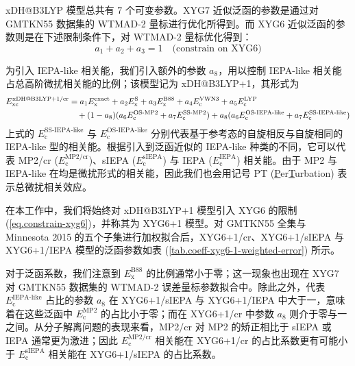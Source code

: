 xDH@B3LYP 模型总共有 7 个可变参数。XYG7 近似泛函的参数是通过对 GMTKN55 数据集的 WTMAD-2 量标进行优化所得到。而 XYG6 近似泛函的参数则是在下述限制条件下，对 WTMAD-2 量标优化得到：
\begin{equation}
  \label{eq.constrain-xyg6}
  a_1 + a_2 + a_3 = 1 \quad \text{(constrain on XYG6)}
\end{equation}

为引入 IEPA-like 相关能，我们引入额外的参数 $a_8$，用以控制 IEPA-like 相关能占总高阶微扰相关能的比例；该模型记为 xDH@B3LYP+1，其形式为
\begin{align}
  E_\mathrm{xc}^\text{xDH@B3LYP+1/cr} &= a_1 E_\mathrm{x}^\mathrm{exact} + a_2 E_\mathrm{x}^\mathrm{S} + a_3 E_\mathrm{x}^\mathrm{B88} + a_4 E_\mathrm{c}^\mathrm{VWN3} + a_5 E_\mathrm{c}^\mathrm{LYP} \notag \\
  &\quad + (1 - a_8) (a_6 E_\mathrm{c}^\text{OS-MP2} + a_7 E_\mathrm{c}^\text{SS-MP2}) + a_8 (a_6 E_\mathrm{c}^\text{OS-IEPA-like} + a_7 E_\mathrm{c}^\text{SS-IEPA-like})
\end{align}
上式的 $E_\mathrm{c}^\text{SS-IEPA-like}$ 与 $E_\mathrm{c}^\text{OS-IEPA-like}$ 分别代表基于参考态的自旋相反与自旋相同的 IEPA-like 型的相关能。根据引入到泛函近似的 IEPA-like 种类的不同，它可以代表 MP2/cr ($E_\mathrm{c}^\mathrm{MP2/cr}$)、sIEPA ($E_\mathrm{c}^\mathrm{sIEPA}$) 与 IEPA ($E_\mathrm{c}^\mathrm{IEPA}$) 相关能。由于 MP2 与 IEPA-like 在均是微扰形式的相关能，因此我们也会用记号 PT (\underline{P}er\underline{T}urbation) 表示总微扰相关效应。

在本工作中，我们将始终对 xDH@B3LYP+1 模型引入 XYG6 的限制 (\ref{eq.constrain-xyg6})，并称其为 XYG6+1 模型。对 GMTKN55 全集与 Minnesota 2015 的五个子集进行加权拟合后，XYG6+1/cr、XYG6+1/sIEPA 与 XYG6+1/IEPA 模型的泛函参数如表 (\ref{tab.coeff-xyg6-1-weighted-error}) 所示。

对于泛函系数，我们注意到 $E_\mathrm{x}^\mathrm{B88}$ 的比例通常小于零；这一现象也出现在 XYG7 对 GMTKN55 数据集的 WTMAD-2 误差量标参数拟合中。除此之外，代表 $E_\mathrm{c}^\text{IEPA-like}$ 占比的参数 $a_8$ 在 XYG6+1/sIEPA 与 XYG6+1/IEPA 中大于一，意味着在这些泛函中 $E_\mathrm{c}^\text{MP2}$ 的占比小于零；而在 XYG6+1/cr 中参数 $a_8$ 则介于零与一之间。从分子解离问题的表现来看，MP2/cr 对 MP2 的矫正相比于 sIEPA 或 IEPA 通常更为激进；因此 $E_\mathrm{c}^\text{MP2/cr}$ 相关能在 XYG6+1/cr 的占比系数更有可能小于 $E_\mathrm{c}^\text{sIEPA}$ 相关能在 XYG6+1/sIEPA 的占比系数。

